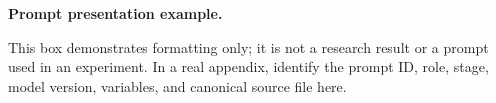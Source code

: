 \noindent\textbf{Prompt presentation example.}\par\smallskip
This box demonstrates formatting only; it is not a research result or a
prompt used in an experiment. In a real appendix, identify the prompt ID,
role, stage, model version, variables, and canonical source file here.

